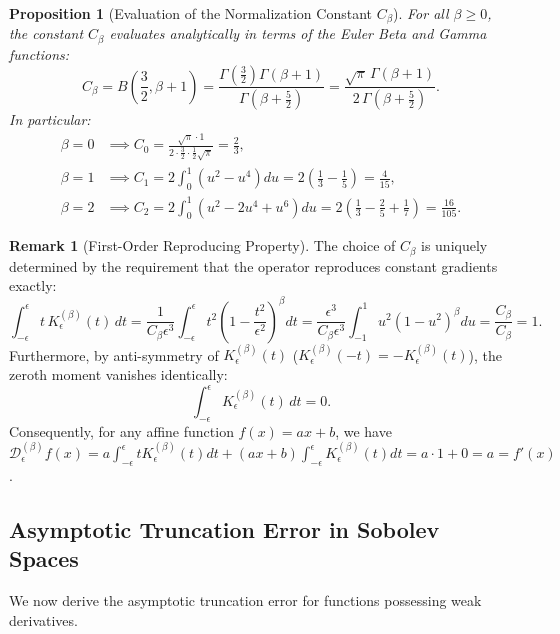 \documentclass[11pt,a4paper]{article}
\newtheorem{proposition}[theorem]{Proposition}
\theoremstyle{definition}
\newtheorem{remark}{Remark}
\begin{document}
\begin{proposition}[Evaluation of the Normalization Constant $C_\beta$]
For all $\beta \ge 0$, the constant $C_\beta$ evaluates analytically in terms of the Euler Beta and Gamma functions:
\begin{equation}
C_\beta = B\left(\frac{3}{2}, \beta + 1\right) = \frac{\Gamma\left(\frac{3}{2}\right)\Gamma(\beta + 1)}{\Gamma\left(\beta + \frac{5}{2}\right)} = \frac{\sqrt{\pi} \, \Gamma(\beta + 1)}{2 \, \Gamma\left(\beta + \frac{5}{2}\right)}.
\end{equation}
In particular:
\begin{align}
\beta = 0 &\implies C_0 = \frac{\sqrt{\pi} \cdot 1}{2 \cdot \frac{3}{2} \cdot \frac{1}{2} \sqrt{\pi}} = \frac{2}{3}, \label{eq:c0} \\
\beta = 1 &\implies C_1 = 2 \int_0^1 (u^2 - u^4) du = 2 \left( \frac{1}{3} - \frac{1}{5} \right) = \frac{4}{15}, \label{eq:c1} \\
\beta = 2 &\implies C_2 = 2 \int_0^1 (u^2 - 2u^4 + u^6) du = 2 \left( \frac{1}{3} - \frac{2}{5} + \frac{1}{7} \right) = \frac{16}{105}. \label{eq:c2}
\end{align}
\end{proposition}

\begin{remark}[First-Order Reproducing Property]
The choice of $C_\beta$ is uniquely determined by the requirement that the operator reproduces constant gradients exactly:
\begin{equation}
\int_{-\epsilon}^{\epsilon} t \, K_\epsilon^{(\beta)}(t) \, dt = \frac{1}{C_\beta \epsilon^3} \int_{-\epsilon}^{\epsilon} t^2 \left(1 - \frac{t^2}{\epsilon^2}\right)^\beta dt = \frac{\epsilon^3}{C_\beta \epsilon^3} \int_{-1}^1 u^2 (1 - u^2)^\beta du = \frac{C_\beta}{C_\beta} = 1.
\end{equation}
Furthermore, by anti-symmetry of $K_\epsilon^{(\beta)}(t)$ ($K_\epsilon^{(\beta)}(-t) = -K_\epsilon^{(\beta)}(t)$), the zeroth moment vanishes identically:
\begin{equation}
\int_{-\epsilon}^{\epsilon} K_\epsilon^{(\beta)}(t) \, dt = 0.
\end{equation}
Consequently, for any affine function $f(x) = a x + b$, we have $\mathcal{D}_\epsilon^{(\beta)} f(x) = a \int_{-\epsilon}^\epsilon t K_\epsilon^{(\beta)}(t) dt + (ax+b)\int_{-\epsilon}^\epsilon K_\epsilon^{(\beta)}(t) dt = a \cdot 1 + 0 = a = f'(x)$.
\end{remark}

\subsection{Asymptotic Truncation Error in Sobolev Spaces}
We now derive the asymptotic truncation error for functions possessing weak derivatives.
\end{document}
